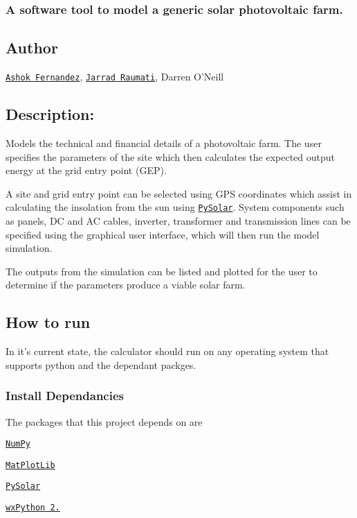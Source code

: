 \subsubsection*{A software tool to model a generic solar photovoltaic farm.}

\subsection*{Author}

\href{https://github.com/ashokfernandez/}{\tt Ashok Fernandez}, \href{https://github.com/jarradraumati/}{\tt Jarrad Raumati}, Darren O'Neill

\subsection*{Description\-:}

Models the technical and financial details of a photovoltaic farm. The user specifies the parameters of the site which then calculates the expected output energy at the grid entry point (G\-E\-P).

A site and grid entry point can be selected using G\-P\-S coordinates which assist in calculating the insolation from the sun using \href{https://github.com/pingswept/pysolar}{\tt Py\-Solar}. System components such as panels, D\-C and A\-C cables, inverter, transformer and transmission lines can be specified using the graphical user interface, which will then run the model simulation.

The outputs from the simulation can be listed and plotted for the user to determine if the parameters produce a viable solar farm.

\subsection*{How to run}

In it's current state, the calculator should run on any operating system that supports python and the dependant packges.

\subsubsection*{Install Dependancies}

The packages that this project depends on are
\begin{DoxyItemize}
\item \href{http://www.numpy.org/}{\tt Num\-Py}
\item \href{http://matplotlib.org/}{\tt Mat\-Plot\-Lib}
\item \href{http://pysolar.org/}{\tt Py\-Solar}
\item \href{http://www.wxpython.org/}{\tt wx\-Python 2.}
\end{DoxyItemize}

